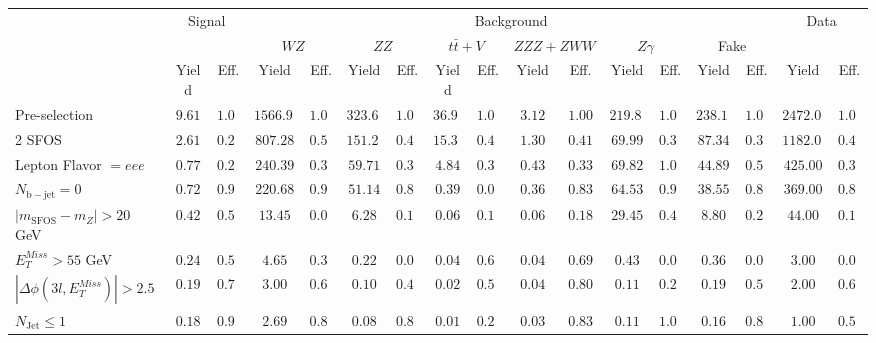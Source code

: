 \begin{tabular}{l||c|c||c|c||c|c||c|c||c|c||c|c||c|c||c|c}
\hline
 &                 \multicolumn{2}{c||}{Signal}            &  \multicolumn{12}{c||}{Background} &  \multicolumn{2}{c}{Data} \\
 & &  & \multicolumn{2}{c||}{$WZ$} & \multicolumn{2}{c||}{$ZZ$} & \multicolumn{2}{c||}{$t\bar{t}+V$} & \multicolumn{2}{c||}{$ZZZ+ZWW$} & \multicolumn{2}{c||}{$Z\gamma$} & \multicolumn{2}{c||}{Fake} &  & \\ 
 & Yield & Eff. & Yield & Eff. & Yield & Eff. & Yield & Eff. & Yield & Eff. & Yield & Eff. & Yield & Eff. & Yield & Eff.\\
\hline\hline
Pre-selection &  $9.61$ &  $1.00$ &  $1566.90$ &  $1.00$ &  $323.60$ &  $1.00$ &  $36.93$ &  $1.00$ &  $3.12$ &  $1.00$ &  $219.80$ &  $1.00$ &  $238.12$ &  $1.00$ &  $2472.00$ &  $1.00$\\ 
\hline
2 SFOS &  $2.61$ &  $0.27$ &  $807.28$ &  $0.52$ &  $151.28$ &  $0.47$ &  $15.35$ &  $0.42$ &  $1.30$ &  $0.41$ &  $69.99$ &  $0.32$ &  $87.34$ &  $0.37$ &  $1182.00$ &  $0.48$\\ 
\hline
Lepton Flavor $= eee$ &  $0.77$ &  $0.29$ &  $240.39$ &  $0.30$ &  $59.71$ &  $0.39$ &  $4.84$ &  $0.32$ &  $0.43$ &  $0.33$ &  $69.82$ &  $1.00$ &  $44.89$ &  $0.51$ &  $425.00$ &  $0.36$\\ 
\hline
$N_{\mathrm{b-jet}}=0$ &  $0.72$ &  $0.93$ &  $220.68$ &  $0.92$ &  $51.14$ &  $0.86$ &  $0.39$ &  $0.08$ &  $0.36$ &  $0.83$ &  $64.53$ &  $0.92$ &  $38.55$ &  $0.86$ &  $369.00$ &  $0.87$\\ 
\hline
$| m_{\mathrm{SFOS}} - m_Z | >  20$ GeV &  $0.42$ &  $0.58$ &  $13.45$ &  $0.06$ &  $6.28$ &  $0.12$ &  $0.06$ &  $0.17$ &  $0.06$ &  $0.18$ &  $29.45$ &  $0.46$ &  $8.80$ &  $0.23$ &  $44.00$ &  $0.12$\\ 
\hline
$E_{T}^{Miss} > 55$ GeV &  $0.24$ &  $0.58$ &  $4.65$ &  $0.35$ &  $0.22$ &  $0.03$ &  $0.04$ &  $0.66$ &  $0.04$ &  $0.69$ &  $0.43$ &  $0.01$ &  $0.36$ &  $0.04$ &  $3.00$ &  $0.07$\\ 
\hline
$|\Delta\phi(3l,E_{T}^{Miss})| > 2.5$ &  $0.19$ &  $0.79$ &  $3.00$ &  $0.64$ &  $0.10$ &  $0.45$ &  $0.02$ &  $0.51$ &  $0.04$ &  $0.80$ &  $0.11$ &  $0.25$ &  $0.19$ &  $0.52$ &  $2.00$ &  $0.67$\\ 
\hline
$N_{\mathrm{Jet}} \leq 1$ &  $0.18$ &  $0.95$ &  $2.69$ &  $0.89$ &  $0.08$ &  $0.80$ &  $0.01$ &  $0.29$ &  $0.03$ &  $0.83$ &  $0.11$ &  $1.00$ &  $0.16$ &  $0.83$ &  $1.00$ &  $0.50$\\ 
\hline
\end{tabular}
